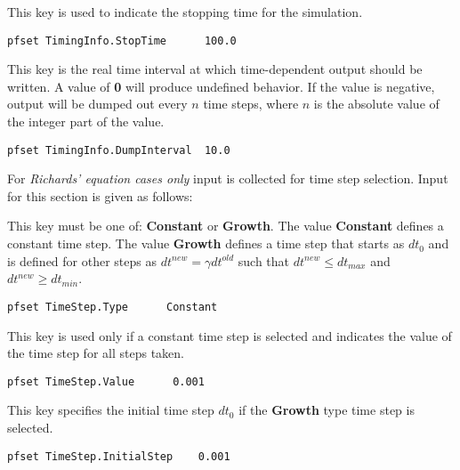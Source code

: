 {
This key is used to indicate the stopping time for the simulation.
}
\begin{display}\begin{verbatim}
pfset TimingInfo.StopTime      100.0
\end{verbatim}\end{display}

{
This key is the real time interval at which time-dependent output should
be written.  A value of {\bf 0} will produce undefined behavior.  If the
value is negative, output will be dumped out every $n$ time steps, where $n$
is the absolute value of the integer part of the value.
}
\begin{display}\begin{verbatim}
pfset TimingInfo.DumpInterval  10.0
\end{verbatim}\end{display}

\vspace{0.5in}

For {\em Richards' equation cases only} input is collected for time step
selection.  Input for this section is given as follows:

{
This key must be one of: {\bf Constant} or {\bf Growth}.  The value
{\bf Constant} defines a constant time step.  The value {\bf Growth}
defines a time step that starts as $dt_0$ and is defined for
other steps as $dt^{new} = \gamma dt^{old}$ such that $dt^{new} \leq 
dt_{max}$ and $dt^{new} \geq dt_{min}$.
}
\begin{display}\begin{verbatim}
pfset TimeStep.Type      Constant
\end{verbatim}\end{display}

{
This key is used only if a constant time step is selected and indicates
the value of the time step for all steps taken.
}
\begin{display}\begin{verbatim}
pfset TimeStep.Value      0.001
\end{verbatim}\end{display}

{
This key specifies the initial time step $dt_0$ if the {\bf Growth} type time
step is selected. 
}
\begin{display}\begin{verbatim}
pfset TimeStep.InitialStep    0.001
\end{verbatim}\end{display}

